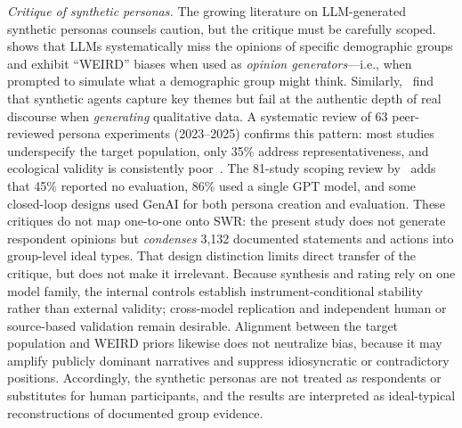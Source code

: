 \documentclass[12pt,a4paper]{article}
\begin{document}
\emph{Critique of synthetic personas.} The growing literature on LLM-generated synthetic personas counsels caution, but the critique must be carefully scoped. \citet{Santurkar2023} shows that LLMs systematically miss the opinions of specific demographic groups and exhibit ``WEIRD'' biases when used as \emph{opinion generators}---i.e., when prompted to simulate what a demographic group might think. Similarly,~\citet{Argyle2023} find that synthetic agents capture key themes but fail at the authentic depth of real discourse when \emph{generating} qualitative data. A systematic review of 63 peer-reviewed persona experiments (2023--2025) confirms this pattern: most studies underspecify the target population, only 35\% address representativeness, and ecological validity is consistently poor~\citep{Batzner2025WhosePersonae}. The 81-study scoping review by~\citet{AminEtAl2026GenAIPersonas} adds that 45\% reported no evaluation, 86\% used a single GPT model, and some closed-loop designs used GenAI for both persona creation and evaluation. These critiques do not map one-to-one onto SWR: the present study does not generate respondent opinions but \emph{condenses} 3,132 documented statements and actions into group-level ideal types. That design distinction limits direct transfer of the critique, but does not make it irrelevant. Because synthesis and rating rely on one model family, the internal controls establish instrument-conditional stability rather than external validity; cross-model replication and independent human or source-based validation remain desirable. Alignment between the target population and WEIRD priors likewise does not neutralize bias, because it may amplify publicly dominant narratives and suppress idiosyncratic or contradictory positions. Accordingly, the synthetic personas are not treated as respondents or substitutes for human participants, and the results are interpreted as ideal-typical reconstructions of documented group evidence.
\end{document}
